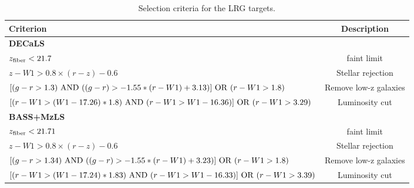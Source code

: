 \begin{table}
  \begin{center}
    \caption{Selection criteria for the LRG targets.}
    \label{tab:ts}
    \begin{tabular}{lc}
    \hline
      \textbf{Criterion} &\textbf{Description}\\
      \hline   
     \textbf{DECaLS} & \\ 
     $z_{\rm fiber} < 21.7$  & faint limit  \\
     $z - W1 > 0.8 \times (r - z) - 0.6$ & Stellar rejection  \\
     $[(g-r >1.3)~{\rm AND}~((g-r) > -1.55*(r-W1) + 3.13)]~{\rm OR}~(r -W 1 > 1.8)$ & Remove low-z galaxies \\
     $[(r-W1 > (W1 - 17.26)*1.8)~{\rm AND}~(r - W1 > W1 - 16.36)]~{\rm OR}~(r-W1 > 3.29)$ & Luminosity cut \\ 
    \hline
     \textbf{BASS+MzLS} & \\ 
     $z_{\rm fiber} < 21.71$  & faint limit  \\
     $z - W1 > 0.8 \times (r - z) - 0.6$ & Stellar rejection  \\
     $[(g-r >1.34)~{\rm AND}~((g-r) > -1.55*(r-W1) + 3.23)]~{\rm OR}~(r -W 1 > 1.8)$ & Remove low-z galaxies \\
     $[(r-W1 > (W1 - 17.24)*1.83)~{\rm AND}~(r - W1 > W1 - 16.33)]~{\rm OR}~(r-W1 > 3.39)$ & Luminosity cut \\ 
      \hline
      \end{tabular}
  \end{center}
\end{table}
